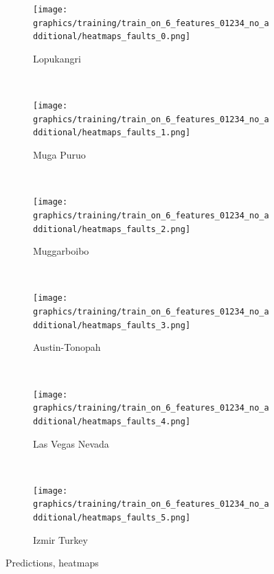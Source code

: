 \documentclass[11pt,a4paper]{article}
\begin{document}
\begin{figure}[t]
    \centering
    \begin{subfigure}[b]{0.12\textwidth}
        \texttt{[image: graphics/training/train\_on\_6\_features\_01234\_no\_additional/heatmaps\_faults\_0.png]}
        \caption{Lopukangri}
        \label{fig:heatmaps_3_Lopukangri}
    \end{subfigure}
    ~
    \begin{subfigure}[b]{0.12\textwidth}
        \texttt{[image: graphics/training/train\_on\_6\_features\_01234\_no\_additional/heatmaps\_faults\_1.png]}
        \caption{Muga Puruo}
        \label{fig:heatmaps_3_Muga_Puruo}
    \end{subfigure}
    ~
    \begin{subfigure}[b]{0.12\textwidth}
        \texttt{[image: graphics/training/train\_on\_6\_features\_01234\_no\_additional/heatmaps\_faults\_2.png]}
        \caption{Muggarboibo}
        \label{fig:heatmaps_3_Muggarboibo}
    \end{subfigure}
    ~
    \begin{subfigure}[b]{0.12\textwidth}
        \texttt{[image: graphics/training/train\_on\_6\_features\_01234\_no\_additional/heatmaps\_faults\_3.png]}
        \caption{Austin-Tonopah}
        \label{fig:heatmaps_3_Austin-Tonopah}
    \end{subfigure}
    ~
    \begin{subfigure}[b]{0.12\textwidth}
        \texttt{[image: graphics/training/train\_on\_6\_features\_01234\_no\_additional/heatmaps\_faults\_4.png]}
        \caption{Las Vegas Nevada}
        \label{fig:heatmaps_3_Las_Vegas_Nevada}
    \end{subfigure}
    ~
    \begin{subfigure}[b]{0.12\textwidth}
        \texttt{[image: graphics/training/train\_on\_6\_features\_01234\_no\_additional/heatmaps\_faults\_5.png]}
        \caption{Izmir Turkey}
        \label{fig:heatmaps_3_Izmir_Turkey}
    \end{subfigure}


    \caption{Predictions, heatmaps}\label{fig:train_on_6_features_01234_no_additional_im}
\end{figure}
\end{document}
